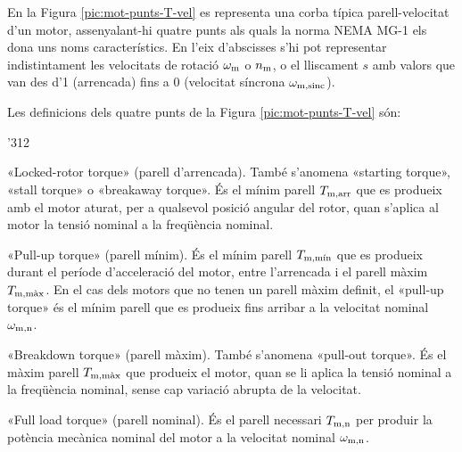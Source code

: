 En la Figura \vref{pic:mot-punts-T-vel} es representa una corba típica parell-velocitat d'un motor, assenyalant-hi quatre punts als quals la norma NEMA MG-1 els dona uns noms característics. En l'eix d'abscisses s'hi pot representar indistintament les velocitats de rotació $\omega_\mathrm{m}$ o $n_\mathrm{m}$, o  el lliscament $s$ amb valors que van des d'1 (arrencada) fins a 0 (velocitat síncrona $\omega_\mathrm{m,sinc}$).

\begin{center}
	
	\label{pic:mot-punts-T-vel}
\end{center}

Les definicions dels quatre punts de la Figura  \vref{pic:mot-punts-T-vel} són:
\begin{dingautolist}{'312}
   \item «Locked-rotor torque» (parell d'arrencada). També s'anomena «starting torque», «stall torque» o «breakaway torque». És el mínim parell $T_\mathrm{m,arr}$ que es produeix amb el motor aturat, per a qualsevol posició angular del rotor, quan s'aplica al motor la tensió nominal a la freqüència nominal.
   \item «Pull-up torque» (parell mínim). És el mínim parell $T_\mathrm{m,\text{mín}}$ que es produeix durant el període d'acceleració del motor, entre l'arrencada  i el parell màxim $T_\mathrm{m,\text{màx}}$. En el cas dels motors que no tenen un parell màxim definit, el «pull-up torque» és el mínim parell que es produeix fins arribar a la velocitat nominal $\omega_\mathrm{m,n}$.
   \item «Breakdown torque» (parell màxim). També s'anomena «pull-out torque». És el màxim parell $T_\mathrm{m,\text{màx}}$ que  produeix  el motor, quan se li aplica  la tensió nominal a la freqüència nominal, sense cap variació abrupta de la velocitat.
   \item «Full load torque» (parell nominal). És el parell necessari $T_\mathrm{m,n}$ per produir la potència mecànica nominal del motor a la velocitat nominal  $\omega_\mathrm{m,n}$.
\end{dingautolist}

